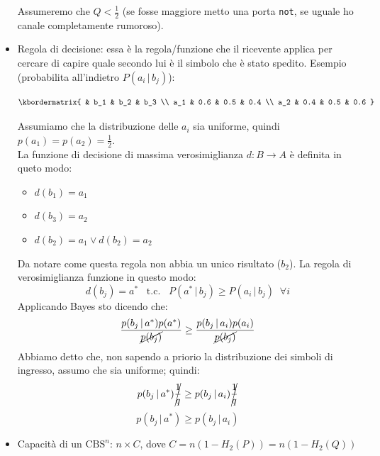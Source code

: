 \begin{itemize}
	Assumeremo che $Q < \frac12$ (se fosse maggiore metto una porta \texttt{not}, se uguale ho canale completamente rumoroso).
	
	\item Regola di decisione: essa è la regola/funzione che il ricevente applica per cercare di capire quale secondo lui è il simbolo che è stato spedito. Esempio (probabilita all'indietro $P(a_i\,|\,b_j)$):

	\[
	\kbordermatrix{
		& b_1 & b_2 & b_3 \\
		a_1 & 0.6 & 0.5 & 0.4 \\
		a_2 & 0.4 & 0.5 & 0.6
	}
	\]
	
	Assumiamo che la distribuzione delle $a_i$ sia uniforme, quindi $p(a_1) = p(a_2) = \frac12$.\\
	
	La funzione di decisione di massima verosimiglianza $d:B\rightarrow A$ è definita in queto modo:
	\begin{itemize}
		\item $d(b_1) = a_1$
		\item $d(b_3) = a_2$
		\item $d(b_2) = a_1 \lor d(b_2) = a_2$		
	\end{itemize} 

	Da notare come questa regola non abbia un unico risultato ($b_2$).
	La regola di verosimiglianza funzione in questo modo:
	\begin{equation*}
	d(b_j) = a^* \;\;\; \text{t.c.} \;\;\; P(a^*\,|\,b_j) \geq P(a_i\,|\,b_j) \; \; \forall i
	\end{equation*}
	Applicando Bayes sto dicendo che:
	\begin{equation*}
	\frac{p(b_j\,|\,a^*)p(a^*)}{\cancel{p(b_j)}} \geq \frac{p(b_j\,|\,a_i)p(a_i)}{\cancel{p(b_j)}}
	\end{equation*}
	Abbiamo detto che, non sapendo a priorio la distribuzione dei simboli di ingresso, assumo che sia uniforme; quindi:
	\begin{equation*}
	p(b_j\,|\,a^*)\cancel{\frac1q} \geq p(b_j\,|\,a_i)\cancel{\frac1q}
	\end{equation*}
	\begin{equation*}
	p(b_j\,|\, a^*) \geq p(b_j\,|\,a_i)
	\end{equation*}
	
	\item Capacità di un $\text{CBS}^n$: $n \times C$, dove $C=n(1-H_2(P)) = n(1-H_2(Q))$
\end{itemize}

